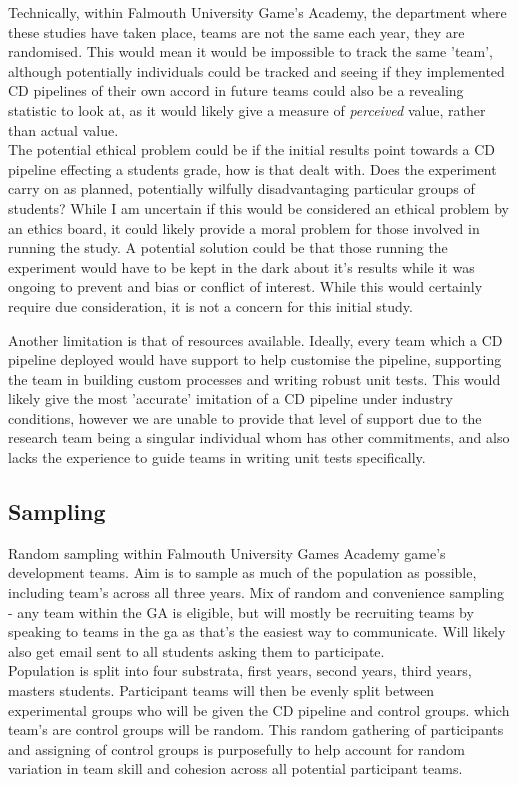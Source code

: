 \documentclass[lettersize,journal]{IEEEtran}
\begin{document}
        Technically, within Falmouth University Game's Academy, the department where these studies have taken place, teams are not the same each year, they are randomised. This would mean it would be impossible to track the same 'team', although potentially individuals could be tracked and seeing if they implemented CD pipelines of their own accord in future teams could also be a revealing statistic to look at, as it would likely give a measure of \textit{perceived} value, rather than actual value. \\
        The potential ethical problem could be if the initial results point towards a CD pipeline effecting a students grade, how is that dealt with. Does the experiment carry on as planned, potentially wilfully disadvantaging particular groups of students? While I am uncertain if this would be considered an ethical problem by an ethics board, it could likely provide a moral problem for those involved in running the study. A potential solution could be that those running the experiment would have to be kept in the dark about it's results while it was ongoing to prevent and bias or conflict of interest. While this would certainly require due consideration, it is not a concern for this initial study.

        Another limitation is that of resources available. Ideally, every team which a CD pipeline deployed would have support to help customise the pipeline, supporting the team in building custom processes and writing robust unit tests. This would likely give the most 'accurate' imitation of a CD pipeline under industry conditions, however we are unable to provide that level of support due to the research team being a singular individual whom has other commitments, and also lacks the experience to guide teams in writing unit tests specifically.

    \subsection{Sampling}
        Random sampling within Falmouth University Games Academy game's development teams. Aim is to sample as much of the population as possible, including team's across all three years. Mix of random and convenience sampling - any team within the GA is eligible, but will mostly be recruiting teams by speaking to teams in the ga as that's the easiest way to communicate. Will likely also get email sent to all students asking them to participate. \\
        Population is split into four substrata, first years, second years, third years, masters students. Participant teams will then be evenly split between experimental groups who will be given the CD pipeline and control groups. which team's are control groups will be random. This random gathering of participants and assigning of control groups is purposefully to help account for random variation in team skill and cohesion across all potential participant teams.
\end{document}
